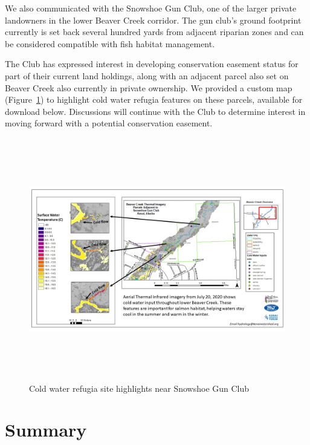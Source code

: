 \documentclass[
  letterpaper,
  DIV=11,
  numbers=noendperiod]{scrreprt}
\begin{document}
We also communicated with the Snowshoe Gun Club, one of the larger
private landowners in the lower Beaver Creek corridor. The gun club's
ground footprint currently is set back several hundred yards from
adjacent riparian zones and can be considered compatible with fish
habitat management.

The Club has expressed interest in developing conservation easement
status for part of their current land holdings, along with an adjacent
parcel also set on Beaver Creek also currently in private ownership. We
provided a custom map (Figure~\ref{fig-sgc-map}) to highlight cold water
refugia features on these parcels, available for download below.
Discussions will continue with the Club to determine interest in moving
forward with a potential conservation easement.

\begin{figure}

{\centering \includegraphics[width=\textwidth,height=4.16667in]{./images/Snowshoe_Gun_Club_Thermal_Imagery_map.jpg}

}

\caption{\label{fig-sgc-map}Cold water refugia site highlights near
Snowshoe Gun Club}

\end{figure}


\hypertarget{summary}{%
\chapter{Summary}\label{summary}}
\end{document}
